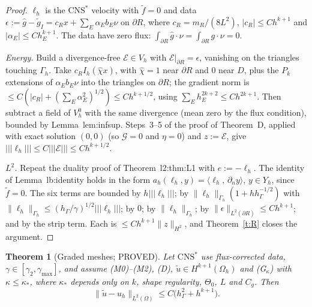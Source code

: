 \documentclass[11pt,reqno]{amsart}
\theoremstyle{plain}
\newtheorem{theorem}{Theorem}[section]
\theoremstyle{definition}
\newcommand{\hG}{h_\Gamma}
\newcommand{\Gh}{\Gamma_h}
\newcommand{\Oh}{\Omega_h}
\newcommand{\Vh}{V_h}
\newcommand{\VO}{V_h^0}
\newcommand{\dn}{\partial_n}
\newcommand{\ut}{\tilde u}
\newcommand{\ft}{\tilde f}
\newcommand{\ip}[2]{\langle #1,\, #2\rangle}
\newcommand{\tnorm}[1]{|\!|\!|#1|\!|\!|}
\newcommand{\norm}[1]{\lVert #1\rVert}
\newcommand{\CNS}{\mathrm{CNS}^\ast}
\newcommand{\Gc}{\mathcal G}
\begin{document}
\begin{proof}
$\ell_h$ is the $\CNS$ velocity with $\ft=0$ and data $\epsilon:=\hat g-\tilde g_I=c_Rx+\sum_E\alpha_Eb_E\nu$ on $\partial R$, where $c_R=m_R/(8L^2)$, $|c_R|\le Ch^{k+1}$ and $|\alpha_E|\le Ch_E^{k+1}$. The data have zero flux: $\int_{\partial R}\hat g\cdot\nu=\int_{\partial R}g\cdot\nu=0$.

\emph{Energy.} Build a divergence-free $\mathcal E\in\Vh$ with $\mathcal E|_{\partial R}=\epsilon$, vanishing on the triangles touching $\Gh$. Take $c_R I_h(\hat\chi x)$, with $\hat\chi=1$ near $\partial R$ and $0$ near $D$, plus the $P_k$ extensions of $\alpha_Eb_E\nu$ into the triangles on $\partial R$; the gradient norm is $\le C(|c_R|+(\sum_E\alpha_E^2)^{1/2})\le Ch^{k+1/2}$, using $\sum_Eh_E^{2k+2}\le Ch^{2k+1}$. Then subtract a field of $\VO$ with the same divergence (mean zero by the flux condition), bounded by Lemma~lem:infsup. Steps~3--5 of the proof of Theorem~D, applied with exact solution $(0,0)$ (so $\Gc=0$ and $\eta=0$) and $z:=\mathcal E$, give $\tnorm{\ell_h}\le C\tnorm{\mathcal E}\le Ch^{k+1/2}$.

\emph{$L^2$.} Repeat the duality proof of Theorem~l2:thm:L1 with $e:=-\ell_h$. The identity of Lemma~lb:identity holds in the form $a_h(\ell_h,y)=\ip{\ell_h}{\dn y}$, $y\in Y_h$, since $\ft=0$. The six terms are bounded by $h\tnorm{\ell_h}$; by $\norm{\ell_h}_{\Gh}(1+h\hG^{-1/2})$ with $\norm{\ell_h}_{\Gh}\le(\hG/\gamma)^{1/2}\tnorm{\ell_h}$; by $0$; by $\norm{\ell_h}_{\Gh}$; by $\norm\epsilon_{L^2(\partial R)}\le Ch^{k+1}$; and by the strip term. Each is $\le Ch^{k+1}\norm z_{H^2}$, and Theorem~\ref{t:R} closes the argument.
\end{proof}

\begin{theorem}[Graded meshes; PROVED]\label{t:G}
Let $\CNS$ use flux-corrected data, $\gamma\in[\gamma_2,\gamma_{\max}]$, and assume (M0)--(M2), (D), $\ut\in H^{k+1}(\Oh)$ and (G$_\kappa$) with $\kappa\le\kappa_\ast$, where $\kappa_\ast$ depends only on $k$, shape regularity, $\Theta_0$, $L$ and $C_g$. Then
\[
\norm{\ut-u_h}_{L^2(\Omega)}\le C\bigl(\hG^2+h^{k+1}\bigr).
\]
\end{theorem}
\end{document}
